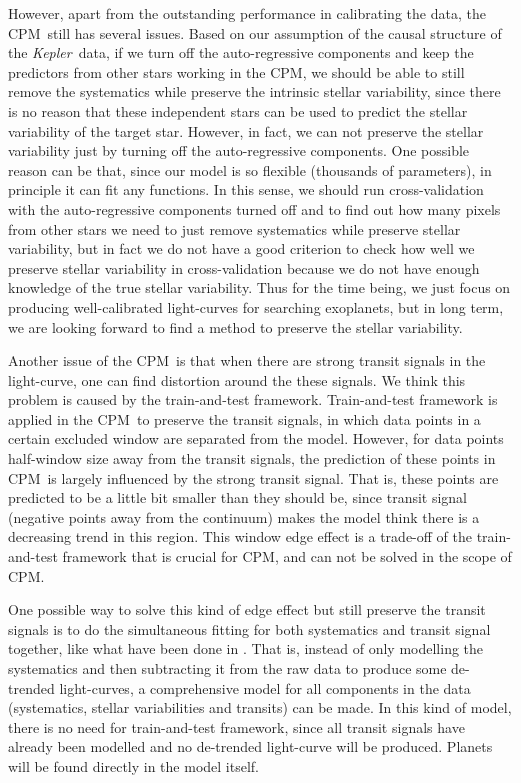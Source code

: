\documentclass[12pt, preprint]{aastex}
\newcommand{\project}[1]{\textsl{#1}}
\newcommand{\Kepler}{\project{Kepler}}
\newcommand{\name}{CPM}
\begin{document}
However, apart from the outstanding performance in calibrating the data,  
  the \name\ still has several issues. 
Based on our assumption of the causal structure of the \Kepler\ data, 
  if we turn off the auto-regressive components and keep the predictors from other stars working in the \name, 
  we should be able to still remove the systematics while preserve the intrinsic stellar variability, 
  since there is no reason that these independent stars can be used to predict the stellar variability of the target star.
However, in fact, we can not preserve the stellar variability just by turning off the auto-regressive components. 
One possible reason can be that, since our model is so flexible (thousands of parameters), 
  in principle it can fit any functions. 
In this sense, 
  we should run cross-validation with the auto-regressive components turned off 
  and to find out how many pixels from other stars we need to just remove systematics 
  while preserve stellar variability, 
  but in fact we do not have a good criterion to check how well we preserve stellar variability in cross-validation 
  because we do not have enough knowledge of the true stellar variability. 
Thus for the time being, we just focus on producing well-calibrated light-curves for searching exoplanets, 
  but in long term, we are looking forward to find a method to preserve the stellar variability.

Another issue of the \name\ is that when there are strong transit signals in the light-curve,  
  one can find distortion around the these signals.
We think this problem is caused by the train-and-test framework.
Train-and-test framework is applied in the \name\ to preserve the transit signals, 
  in which data points in a certain excluded window are separated from the model.
However, for data points half-window size away from the transit signals, 
  the prediction of these points in \name\ is largely influenced by the strong transit signal.
That is,  these points are predicted to be a little bit smaller than they should be, 
  since transit signal (negative points away from the continuum) makes the model think
  there is a decreasing trend in this region.
This window edge effect is a trade-off of the train-and-test framework that is crucial for \name,
 and can not be solved in the scope of \name.

One possible way to solve this kind of edge effect 
  but still preserve the transit signals is to do the simultaneous fitting 
  for both systematics and transit signal together, 
  like what have been done in \cite{dfm}. 
That is,  
  instead of only modelling the systematics 
  and then subtracting it from the raw data to produce some de-trended light-curves,
  a comprehensive model for all components in the data (systematics, stellar variabilities and transits)  can be made. In this kind of model, there is no need for train-and-test framework,
  since all transit signals have already been modelled 
  and no de-trended light-curve will be produced. Planets will be found directly in the model itself. 
\end{document}

